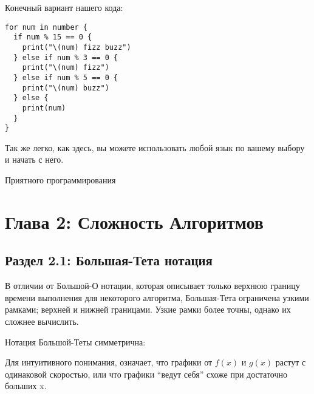 \vspace{\baselineskip}

Конечный вариант нашего кода:

\vspace{\baselineskip}

\begin{tcolorbox} 
\begin{verbatim}
for num in number {
  if num % 15 == 0 {
    print("\(num) fizz buzz")
  } else if num % 3 == 0 {
    print("\(num) fizz")
  } else if num % 5 == 0 {
    print("\(num) buzz")
  } else {
    print(num)
  } 
}
\end{verbatim}
\end{tcolorbox}

\vspace{\baselineskip}

Так же легко, как здесь, вы можете использовать любой язык по вашему выбору и начать с него.

\vspace{\baselineskip}

Приятного программирования

\chapter*{Глава 2: Сложность Алгоритмов}

\section*{Раздел 2.1: Большая-Тета нотация}

В отличии от Большой-О нотации, которая описывает только верхнюю границу времени выполнения для некоторого алгоритма, Большая-Тета ограничена узкими рамками; верхней и нижней границами. Узкие рамки более точны, однако их сложнее вычислить.

\vspace{\baselineskip}

Нотация Большой-Теты симметрична: 

\vspace{\baselineskip}

Для интуитивного понимания,  означает, что графики от $f(x)$ и $g(x)$ растут с одинаковой скоростью, или что графики “ведут себя” схоже при достаточно больших x.

